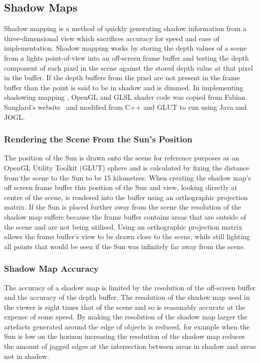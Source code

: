 \documentclass[12pt]{report}
\newcommand{\note}[1]{}
\begin{document}
\subsection{Shadow Maps}
Shadow mapping is a method of quickly generating shadow information from a three-dimensional view which sacrifices accuracy for speed and ease of implementation. Shadow mapping works by storing the depth values of a scene from a lights point-of-view into an off-screen frame buffer and testing the depth component of each pixel in the scene against the stored depth value at that pixel in the buffer. If the depth buffers from the pixel are not present in the frame buffer than the point is said to be in shadow and is dimmed. In implementing shadowing mapping , OpenGL and GLSL shader code was copied from Fabian Sanglard's website~\cite{shadowb} and modified from C++ and GLUT to run using Java and JOGL.

\subsubsection{Rendering the Scene From the Sun's Position}
The position of the Sun is drawn onto the scene for reference purposes as an OpenGL Utility Toolkit (GLUT) sphere and is calculated by fixing the distance from the scene to the Sun to be 15 kilometres. When creating the shadow map's off screen frame buffer this position of the Sun and view, looking directly at centre of the scene, is rendered into the buffer using an orthographic projection matrix. If the Sun is placed further away from the scene the resolution of the shadow map suffers because the frame buffer contains areas that are outside of the scene and are not being utilised. Using an orthographic projection matrix allows the frame buffer's view to be drawn close to the scene, while still lighting all points that would be seen if the Sun was infinitely far away from the scene.

\subsubsection{Shadow Map Accuracy}
The accuracy of a shadow map is limited by the resolution of the off-screen buffer and the accuracy of the depth buffer. The resolution of the shadow map used in the viewer is eight times that of the scene and so is reasonably accurate at the expense of some speed. By making the resolution of the shadow map larger the artefacts\note{I think this is the correct spelling of artefact for British English countries. According to wikipedia artifact is a minor variant preferred in North America. According to wiktionary artefact is preferred ``for a false signal in data caused by the processing''. What do you think?} generated around the edge of objects is reduced, for example when the Sun is low on the horizon increasing the resolution of the shadow map reduces the amount of jagged edges at the intersection between areas in shadow and areas not in shadow. 
\end{document}
